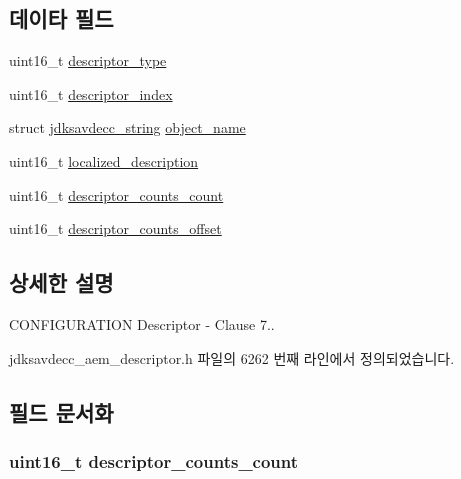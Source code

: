\subsection*{데이타 필드}
\begin{DoxyCompactItemize}
\item 
uint16\+\_\+t \hyperlink{structjdksavdecc__descriptor__configuration_ab7c32b6c7131c13d4ea3b7ee2f09b78d}{descriptor\+\_\+type}
\item 
uint16\+\_\+t \hyperlink{structjdksavdecc__descriptor__configuration_a042bbc76d835b82d27c1932431ee38d4}{descriptor\+\_\+index}
\item 
struct \hyperlink{structjdksavdecc__string}{jdksavdecc\+\_\+string} \hyperlink{structjdksavdecc__descriptor__configuration_a7d1f5945a13863b1762fc6db74fa8f80}{object\+\_\+name}
\item 
uint16\+\_\+t \hyperlink{structjdksavdecc__descriptor__configuration_a0926f846ca65a83ad5bb06b4aff8f408}{localized\+\_\+description}
\item 
uint16\+\_\+t \hyperlink{structjdksavdecc__descriptor__configuration_aecc8a2d99e1f750676ee92f68ddd1fa6}{descriptor\+\_\+counts\+\_\+count}
\item 
uint16\+\_\+t \hyperlink{structjdksavdecc__descriptor__configuration_ae57b83bb9db0fb81735dba7d02bac8bb}{descriptor\+\_\+counts\+\_\+offset}
\end{DoxyCompactItemize}


\subsection{상세한 설명}
C\+O\+N\+F\+I\+G\+U\+R\+A\+T\+I\+ON Descriptor -\/ Clause 7.. 

jdksavdecc\+\_\+aem\+\_\+descriptor.\+h 파일의 6262 번째 라인에서 정의되었습니다.



\subsection{필드 문서화}
\subsubsection[{\texorpdfstring{descriptor\+\_\+counts\+\_\+count}{descriptor_counts_count}}]{\setlength{\rightskip}{0pt plus 5cm}uint16\+\_\+t descriptor\+\_\+counts\+\_\+count}\hypertarget{structjdksavdecc__descriptor__configuration_aecc8a2d99e1f750676ee92f68ddd1fa6}{}\label{structjdksavdecc__descriptor__configuration_aecc8a2d99e1f750676ee92f68ddd1fa6}


